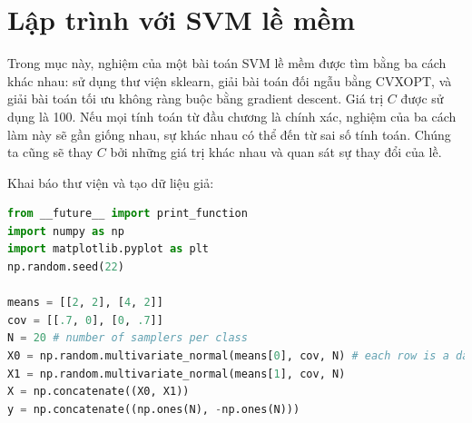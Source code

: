 


\section{Lập trình với SVM lề mềm}
Trong mục này, nghiệm của một bài toán SVM lề mềm được tìm bằng ba cách khác nhau: sử dụng thư viện sklearn, giải bài toán đối ngẫu
bằng CVXOPT, và giải bài toán tối ưu không ràng buộc bằng gradient
descent. Giá trị $C$ được sử dụng là 100.
Nếu mọi tính toán từ đầu chương là chính xác, nghiệm của ba cách làm này sẽ
gần giống nhau, sự khác nhau có thể đến từ sai số tính toán.
Chúng ta cũng sẽ thay $C$ bởi những giá trị khác nhau và quan sát sự thay đổi của lề.



Khai báo thư viện và tạo dữ liệu giả:

\begin{lstlisting}[language=Python]
from __future__ import print_function
import numpy as np
import matplotlib.pyplot as plt
np.random.seed(22)

means = [[2, 2], [4, 2]]
cov = [[.7, 0], [0, .7]]
N = 20 # number of samplers per class
X0 = np.random.multivariate_normal(means[0], cov, N) # each row is a data point
X1 = np.random.multivariate_normal(means[1], cov, N)
X = np.concatenate((X0, X1))
y = np.concatenate((np.ones(N), -np.ones(N)))
\end{lstlisting}

